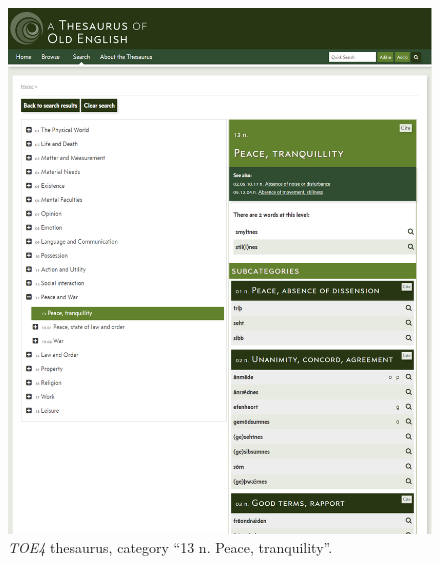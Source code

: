 \begin{figure}[htbp]
  \centering
    \includegraphics[width=\linewidth]{Stolk_thes-content/fig/thes/TOE4-thesaurus-peacetranquility.png}
  \caption{\textit{TOE4} thesaurus, category ``13 n. Peace, tranquility''.}
  \label{fig:1.A:TOE4:thesaurus}
\end{figure}

